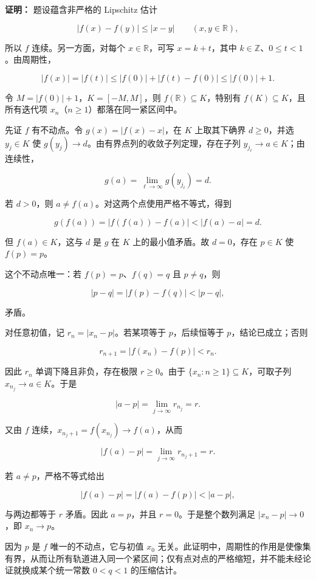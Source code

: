 \documentclass[11pt,a4paper]{article}
\begin{document}
\textbf{证明：} 题设蕴含非严格的 Lipschitz 估计

\[
|f(x)-f(y)|\le|x-y|\qquad(x,y\in\mathbb R),
\]

所以 \(f\) 连续。另一方面，对每个 \(x\in\mathbb R\)，可写
\(x=k+t\)，其中 \(k\in\mathbb Z\)、\(0\le t<1\)。由周期性，

\[
|f(x)|=|f(t)|
\le |f(0)|+|f(t)-f(0)|
\le |f(0)|+1.
\]

令 \(M=|f(0)|+1\)，\(K=[-M,M]\)，则 \(f(\mathbb R)\subseteq K\)，特别有
\(f(K)\subseteq K\)，且所有迭代项
\(x_n\)（\(n\ge1\)）都落在同一紧区间中。

先证 \(f\) 有不动点。令 \(g(x)=|f(x)-x|\)，在 \(K\) 上取其下确界
\(d\ge0\)，并选 \(y_j\in K\) 使
\(g(y_j)\to d\)。由有界点列的收敛子列定理，存在子列
\(y_{j_\ell}\to a\in K\)；由连续性，

\[
g(a)=\lim_{\ell\to\infty}g(y_{j_\ell})=d.
\]

若 \(d>0\)，则 \(a\ne f(a)\)。对这两个点使用严格不等式，得到

\[
g(f(a))=|f(f(a))-f(a)|
<|f(a)-a|=d.
\]

但 \(f(a)\in K\)，这与 \(d\) 是 \(g\) 在 \(K\) 上的最小值矛盾。故
\(d=0\)，存在 \(p\in K\) 使 \(f(p)=p\)。

这个不动点唯一：若 \(f(p)=p\)、\(f(q)=q\) 且 \(p\ne q\)，则

\[
|p-q|=|f(p)-f(q)|<|p-q|,
\]

矛盾。

对任意初值，记 \(r_n=|x_n-p|\)。若某项等于 \(p\)，后续恒等于
\(p\)，结论已成立；否则

\[
r_{n+1}=|f(x_n)-f(p)|<r_n.
\]

因此 \(r_n\) 单调下降且非负，存在极限 \(r\ge0\)。由于
\(\{x_n:n\ge1\}\subseteq K\)，可取子列 \(x_{n_j}\to a\in K\)。于是

\[
|a-p|=\lim_{j\to\infty}r_{n_j}=r.
\]

又由 \(f\) 连续，\(x_{n_j+1}=f(x_{n_j})\to f(a)\)，从而

\[
|f(a)-p|=\lim_{j\to\infty}r_{n_j+1}=r.
\]

若 \(a\ne p\)，严格不等式给出

\[
|f(a)-p|=|f(a)-f(p)|<|a-p|,
\]

与两边都等于 \(r\) 矛盾。因此 \(a=p\)，并且 \(r=0\)。于是整个数列满足
\(|x_n-p|\to0\)，即 \(x_n\to p\)。

因为 \(p\) 是 \(f\) 唯一的不动点，它与初值 \(x_0\)
无关。此证明中，周期性的作用是使像集有界，从而让所有轨道进入同一个紧区间；仅有点对点的严格缩短，并不能未经论证就换成某个统一常数
\(0<q<1\) 的压缩估计。
\end{document}
